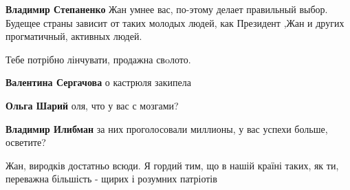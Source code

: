 \begin{itemize}
\begin{itemize}
 
\textbf{Владимир Степаненко}
Жан умнее вас, по-этому делает правильный выбор. Будещее страны зависит от таких
молодых людей, как Президент ,Жан и других прогматичный, активных людей.

 
Тебе потрібно лінчувати, продажна свoлото.

 
\textbf{Валентина Сергачова} о кастрюля закипела

 
\textbf{Ольга Шарий} оля, что у вас с мозгами?

 
\textbf{Владимир Илибман} за них проголосовали миллионы, у вас успехи больше, осветите?

\end{itemize}

 

Жан, виродків достатньо всюди. Я гордий тим, що в нашій країні таких, як ти,
переважна більшість - щирих і розумних патріотів 


\end{itemize}
